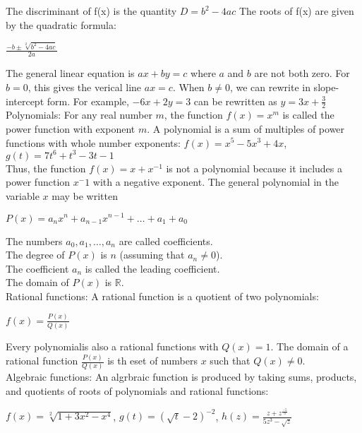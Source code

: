 \documentclass{article}
\begin{document}
The discriminant of f(x) is the quantity $D = b^2 - 4ac$ The roots of f(x) are given by the quadratic formula:\\
\begin{center}$\frac{-b \pm \sqrt[2]{b^2 - 4ac}}{2a}$ \end{center}

The general linear equation is $ax + by = c$ where $a$ and $b$ are not both zero. For $b = 0$, this gives the verical line $ax = c$. When $b \neq 0$, we can rewrite in slope-intercept form. For example, $-6x + 2y =3$ can be rewritten as $y = 3x + \frac{3}{2}$\\

Polynomials: For any real number $m$, the function $f(x) = x^m$ is called the power function with exponent $m$. A polynomial is a sum of multiples of power functions with whole number exponents: $f(x) = x^5 -5x^3 + 4x$, $g(t) = 7t^6 +t^3 - 3t -1$\\

Thus, the function $f(x) = x + x^{-1}$ is not a polynomial because it includes a power function $x^-1$ with a negative exponent. The general polynomial in the variable $x$ may be written\\
\begin{center}$P(x) = a_nx^n + a_{n-1}x^{n-1} + \dots + a_1 + a_0$\end{center}
The numbers $a_0, a_1, \dots, a_n$ are called coefficients.\\
The degree of $P(x)$ is $n$ (assuming that $a_n \neq 0$).\\
The coefficient $a_n$ is called the leading coefficient.\\
The domain of $P(x)$ is $\mathbb{R}$.\\

Rational functions: A rational function is a quotient of two polynomials:\\
\begin{center}$f(x) = \frac{P(x)}{Q(x)}$\end{center}
Every polynomialis also a rational functions with $Q(x) = 1$. The domain of a rational function $\frac{P(x)}{Q(x)}$ is th eset of numbers $x$ such that $Q(x) \neq 0$.\\

Algebraic functions: An algrbraic function is produced by taking sums, products, and quotients of roots of polynomials and rational functions:\\
\begin{center} $f(x) = \sqrt[2]{1 + 3x^2 - x^4}$, $g(t) = (\sqrt{t} - 2)^{-2}$, $h(z) = \frac{z + z^{\frac{-5}{3}}}{5z^3 - \sqrt{z}}$\end{center}
\end{document}
